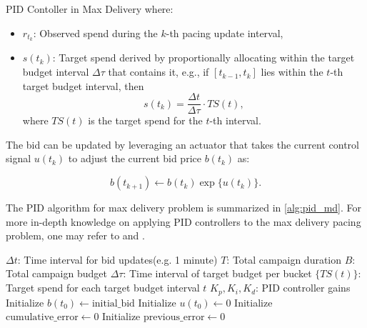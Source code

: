 \documentclass[../main.tex]{subfiles}
\begin{document}
\begin{section}{PID Contoller in Max Delivery}
		where:
		\begin{itemize}
			\item \(r_{t_k}\): Observed spend during the \(k\)-th pacing update interval,
			\item \(s(t_k)\): Target spend derived by proportionally allocating within the target budget interval \(\Delta\tau\) that contains it, e.g., if \([t_{k-1}, t_k]\) lies within the \(t\)-th target budget interval, then 
			\[
			s(t_k) = \frac{\Delta t}{\Delta\tau} \cdot TS(t),
			\]
			where \(TS(t)\) is the target spend for the \(t\)-th interval.
			
		\end{itemize}
		
		The bid can be updated by leveraging an actuator that takes the current control signal \(u(t_k)\) to adjust the current bid price \(b(t_k)\) as:
		
		\[
		b(t_{k+1}) \gets b(t_k) \exp\{u(t_{k})\}.
		\]
		
		The PID algorithm for max delivery problem is summarized in \autoref{alg:pid_md}. For more in-depth knowledge on applying PID controllers to the max delivery pacing problem, one may refer to  \cite{wang2017display} and \cite{zhang2016feedback}.
		
		\begin{algorithm}
			\caption{PID Controller for Bid Price Modulation in Max Delivery}
			\label{alg:pid_md}
			\begin{algorithmic}[1]
				\Require $\Delta t$: Time interval for bid updates(e.g. 1 minute)
				\Require $T$: Total campaign duration
				\Require $B$: Total campaign budget
				\Require $\Delta \tau$: Time interval of target budget per bucket
				\Require $\{ TS(t) \}$: Target spend for each target budget interval $t$
				\Require $K_p, K_i, K_d$: PID controller gains
				\State Initialize $b(t_0) \gets \text{initial\_bid}$
				\State Initialize $u(t_0) \gets 0$
				\State Initialize $\text{cumulative\_error} \gets 0$
				\State Initialize $\text{previous\_error} \gets 0$
				

\end{algorithmic}
\end{algorithm}
\end{section}
\end{document}
